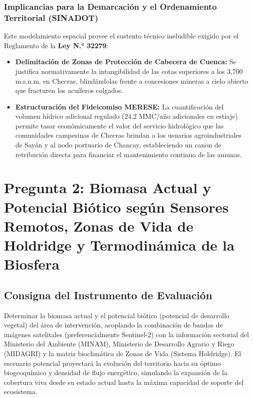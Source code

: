 \documentclass[11pt,a4paper]{article}
\begin{document}
\subsubsection{Implicancias para la Demarcación y el Ordenamiento Territorial (SINADOT)}
Este modelamiento espacial provee el sustento técnico ineludible exigido por el Reglamento de la \textbf{Ley N.° 32279}:
\begin{itemize}[leftmargin=*]
    \item \textbf{Delimitación de Zonas de Protección de Cabecera de Cuenca:} Se justifica normativamente la intangibilidad de las cotas superiores a los 3,700 m.s.n.m. en Checras, blindándolas frente a concesiones mineras a cielo abierto que fracturen los acuíferos colgados.
    \item \textbf{Estructuración del Fideicomiso MERESE:} La cuantificación del volumen hídrico adicional regulado ($24.2\text{ MMC/año}$ adicionales en estiaje) permite tasar económicamente el valor del servicio hidrológico que las comunidades campesinas de Checras brindan a los usuarios agroindustriales de Sayán y al nodo portuario de Chancay, estableciendo un canon de retribución directa para financiar el mantenimiento continuo de las amunas.
\end{itemize}

\newpage

\section{Pregunta 2: Biomasa Actual y Potencial Biótico según Sensores Remotos, Zonas de Vida de Holdridge y Termodinámica de la Biosfera}

\subsection{Consigna del Instrumento de Evaluación}
Determinar la biomasa actual y el potencial biótico (potencial de desarrollo vegetal) del área de intervención, acoplando la combinación de bandas de imágenes satelitales (preferencialmente Sentinel-2) con la información sectorial del Ministerio del Ambiente (MINAM), Ministerio de Desarrollo Agrario y Riego (MIDAGRI) y la matriz bioclimática de Zonas de Vida (Sistema Holdridge). El escenario potencial proyectará la evolución del territorio hacia su óptimo biogeoquímico y densidad de flujo energético, simulando la expansión de la cobertura viva desde su estado actual hasta la máxima capacidad de soporte del ecosistema.
\end{document}
